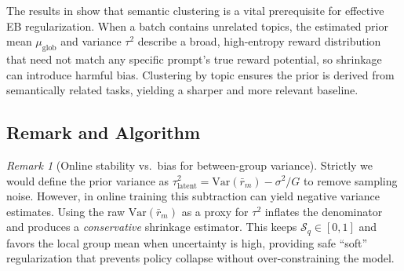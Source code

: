 \documentclass{article}
\theoremstyle{plain}
\theoremstyle{definition}
\theoremstyle{remark}
\newtheorem{remark}[theorem]{Remark}
\begin{document}
The results in  show that semantic clustering is a vital prerequisite for effective EB regularization. When a batch contains unrelated topics, the estimated prior mean $\mu_{\text{glob}}$ and variance $\tau^2$ describe a broad, high-entropy reward distribution that need not match any specific prompt's true reward potential, so shrinkage can introduce harmful bias. Clustering by topic ensures the prior is derived from semantically related tasks, yielding a sharper and more relevant baseline.

\subsection{Remark and Algorithm}
\begin{remark}[Online stability vs.\ bias for between-group variance]
\label{remark:between_group_var}
Strictly we would define the prior variance as $\tau_{\text{latent}}^2 = \text{Var}(\bar r_m) - \sigma^2/G$ to remove sampling noise. However, in online training this subtraction can yield negative variance estimates. Using the raw $\text{Var}(\bar r_m)$ as a proxy for $\tau^2$ inflates the denominator and produces a \emph{conservative} shrinkage estimator. This keeps $\mathcal{S}_q\in[0,1]$ and favors the local group mean when uncertainty is high, providing safe ``soft'' regularization that prevents policy collapse without over-constraining the model.
\end{remark}
\end{document}
